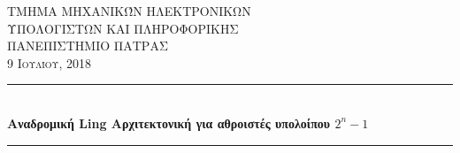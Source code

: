 
\begin{titlepage} %
	\newcommand{\HRule}{\rule{\linewidth}{0.5mm}} %
	
	\center %
	
	
	\textsc{\LARGE ΤΜΗΜΑ ΜΗΧΑΝΙΚΏΝ ΗΛΕΚΤΡΟΝΙΚΩΝ \\[0.2cm] ΥΠΟΛΟΓΙΣΤΩΝ ΚΑΙ ΠΛΗΡΟΦΟΡΙΚΗΣ}\\[1.5cm]
	\textsc{\Large ΠΑΝΕΠΙΣΤΗΜΙΟ ΠΑΤΡΑΣ}\\[0.8cm] 
	\textsc{\large 9 Ιουλίου, 2018}\\[1cm]
	
	
	\HRule\\[0.4cm]
	{\huge\bfseries Αναδρομική Ling Αρχιτεκτονική για αθροιστές υπολοίπου $2^n-1$}\\[0.4cm] 
	\HRule\\[3cm]
	


\end{titlepage}
